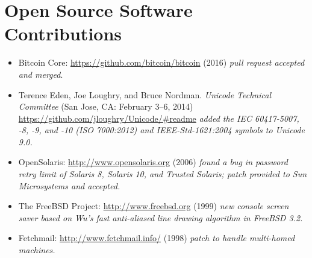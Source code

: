\section*{Open Source Software Contributions}
\vspace{-2mm}

\begin{itemize}
    \item Bitcoin Core: \url{https://github.com/bitcoin/bitcoin} (2016)
        \emph{pull request accepted and merged}.\vspace{-2mm}
	\item Terence Eden, Joe Loughry, and Bruce Nordman. \emph{Unicode
		Technical Committee} (San Jose, CA: February 3--6, 2014)
		\url{https://github.com/jloughry/Unicode/#readme} \emph{added
		the IEC 60417-5007, -8, -9, and -10 (ISO 7000:2012) and
		IEEE-Std-1621:2004 symbols to Unicode 9.0.}\vspace{-2mm}
	\item OpenSolaris: \url{http://www.opensolaris.org} (2006)
		\emph{found a bug in password retry limit of Solaris 8, Solaris 10,
		and Trusted Solaris; patch provided to Sun Microsystems and accepted.}\vspace{-2mm}
	\item The FreeBSD Project: \url{http://www.freebsd.org} (1999)
		\emph{new console screen saver based on Wu's fast
		anti-aliased line drawing algorithm in FreeBSD 3.2.}\vspace{-2mm}
	\item Fetchmail: \url{http://www.fetchmail.info/} (1998)
		\emph{patch to handle multi-homed machines.}
\end{itemize}

